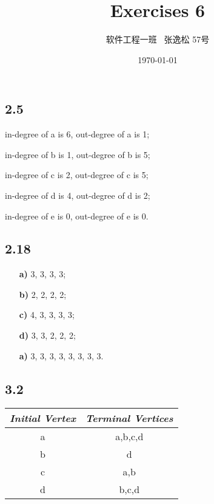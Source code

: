 \documentclass[10pt]{ctexart}
\title{Exercises 6}
\author{软件工程一班 \ 张逸松 57号}
\date{\today}
\begin{document}
    \maketitle
    \subsection*{2.5}
    in-degree of a is 6, out-degree of a is 1; \par
    in-degree of b is 1, out-degree of b is 5; \par
    in-degree of c is 2, out-degree of c is 5; \par
    in-degree of d is 4, out-degree of d is 2; \par
    in-degree of e is 0, out-degree of e is 0. \par
    \subsection*{2.18}
    \begin{itemize}
        \item [\textbf{a)}] 3, 3, 3, 3; \par
        \item [\textbf{b)}] 2, 2, 2, 2; \par
        \item [\textbf{c)}] 4, 3, 3, 3, 3; \par
        \item [\textbf{d)}] 3, 3, 2, 2, 2; \par
        \item [\textbf{a)}] 3, 3, 3, 3, 3, 3, 3, 3. \par
    \end{itemize}
    \subsection*{3.2}
    \begin{table}[h]
        \begin{tabular}{c | c}
        \hline
        \textit{\textbf{Initial Vertex}} & \textit{\textbf{Terminal Vertices}} \\ \hline
        a                                & a,b,c,d                             \\
        b                                & d                                   \\
        c                                & a,b                                 \\
        d                                & b,c,d                               \\ \hline
        \end{tabular}
    \end{table}
\end{document}
